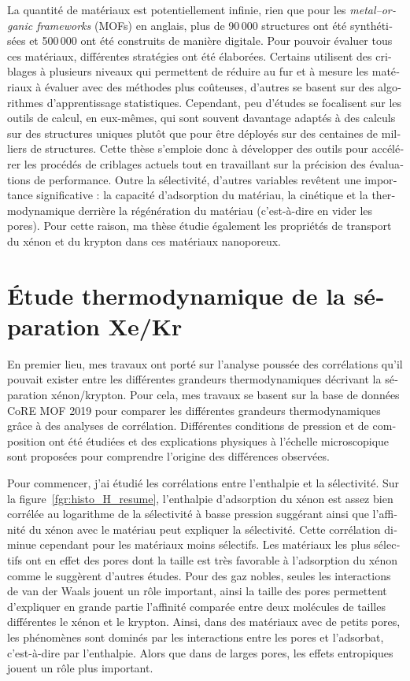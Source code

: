 \documentclass[thesis]{subfiles}
\begin{document}
\begin{otherlanguage}{french}
La quantité de matériaux est potentiellement infinie, rien que pour les \emph{metal--organic frameworks} (MOFs) en anglais, plus de 90\,000 structures ont été synthétisées et 500\,000 ont été construits de manière digitale. Pour pouvoir évaluer tous ces matériaux, différentes stratégies ont été élaborées. Certains utilisent des criblages à plusieurs niveaux qui permettent de réduire au fur et à mesure les matériaux à évaluer avec des méthodes plus coûteuses, d'autres se basent sur des algorithmes d'apprentissage statistiques. Cependant, peu d'études se focalisent sur les outils de calcul, en eux-mêmes, qui sont souvent davantage adaptés à des calculs sur des structures uniques plutôt que pour être déployés sur des centaines de milliers de structures. Cette thèse s'emploie donc à développer des outils pour accélérer les procédés de criblages actuels tout en travaillant sur la précision des évaluations de performance. Outre la sélectivité, d'autres variables revêtent une importance significative : la capacité d'adsorption du matériau, la cinétique et la thermodynamique derrière la régénération du matériau (c'est-à-dire en vider les pores). Pour cette raison, ma thèse étudie également les propriétés de transport du xénon et du krypton dans ces matériaux nanoporeux. 

\section*{\'Etude thermodynamique de la séparation Xe/Kr}

En premier lieu, mes travaux ont porté sur l'analyse poussée des corrélations qu'il pouvait exister entre les différentes grandeurs thermodynamiques décrivant la séparation xénon/krypton. Pour cela, mes travaux se basent sur la base de données CoRE MOF 2019 pour comparer les différentes grandeurs thermodynamiques grâce à des analyses de corrélation. Différentes conditions de pression et de composition ont été étudiées et des explications physiques à l'échelle microscopique sont proposées pour comprendre l'origine des différences observées. 

Pour commencer, j'ai étudié les corrélations entre l'enthalpie et la sélectivité. Sur la figure~\ref{fgr:histo_H_resume}, l'enthalpie d'adsorption du xénon est assez bien corrélée au logarithme de la sélectivité à basse pression suggérant ainsi que l'affinité du xénon avec le matériau peut expliquer la sélectivité. Cette corrélation diminue cependant pour les matériaux moins sélectifs. Les matériaux les plus sélectifs ont en effet des pores dont la taille est très favorable à l'adsorption du xénon comme le suggèrent d'autres études. Pour des gaz nobles, seules les interactions de van der Waals jouent un rôle important, ainsi la taille des pores permettent d'expliquer en grande partie l'affinité comparée entre deux molécules de tailles différentes le xénon et le krypton. Ainsi, dans des matériaux avec de petits pores, les phénomènes sont dominés par les interactions entre les pores et l'adsorbat, c'est-à-dire par l'enthalpie. Alors que dans de larges pores, les effets entropiques jouent un rôle plus important.


\end{otherlanguage}
\end{document}
